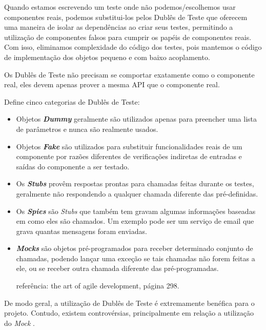 Quando estamos escrevendo um teste onde não podemos/escolhemos usar componentes reais, podemos substitui-los pelos Dublês de Teste que oferecem uma maneira de isolar as dependências ao criar seus testes, permitindo a utilização de componentes falsos para cumprir os papéis de componentes reais. Com isso, eliminamos complexidade do código dos testes, pois mantemos o código de implementação dos objetos pequeno e com baixo acoplamento.

Os Dublês de Teste não precisam se comportar exatamente como o componente real, eles devem apenas prover a mesma API que o componente real.

 Define cinco categorias de Dublês de Teste:

\begin{itemize}
\item
Objetos \textbf{\textit{Dummy}} geralmente são utilizados apenas para preencher uma lista de parâmetros e nunca são realmente usados.

\item
Objetos \textbf{\textit{Fake}} são utilizados para substituir funcionalidades reais de um componente por razões diferentes de verificações indiretas de entradas e saídas do componente a ser   testado.

\item
Os \textbf{\textit{Stubs}} provêm respostas prontas para chamadas feitas durante os testes, geralmente não respondendo a qualquer   chamada diferente
das pré-definidas.

\item
Os \textbf{\textit{Spies}} são \textit{Stubs} que também tem gravam algumas informações baseadas em como eles são chamados. Um exemplo   pode ser um serviço de email que grava quantas mensagens foram   enviadas.

\item
\textbf{\textit{Mocks}} são objetos pré-programados para receber determinado conjunto de chamadas, podendo lançar uma exceção se tais chamadas não forem feitas a ele, ou se receber outra chamada diferente das pré-programadas.

referência: the art of agile development, página 298.
\end{itemize}

De modo geral, a utilização de Dublês de Teste é extremamente benéfica para o projeto. Contudo, existem controvérsias, principalmente em relação a utilização do \textit{Mock} \cite{MocksArentStubs}.